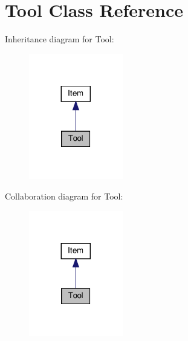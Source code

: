 \hypertarget{classTool}{}\section{Tool Class Reference}
\label{classTool}


Inheritance diagram for Tool\+:
\nopagebreak
\begin{figure}[H]
\begin{center}
\leavevmode
\includegraphics[width=116pt]{classTool__inherit__graph}
\end{center}
\end{figure}


Collaboration diagram for Tool\+:
\nopagebreak
\begin{figure}[H]
\begin{center}
\leavevmode
\includegraphics[width=116pt]{classTool__coll__graph}
\end{center}
\end{figure}
